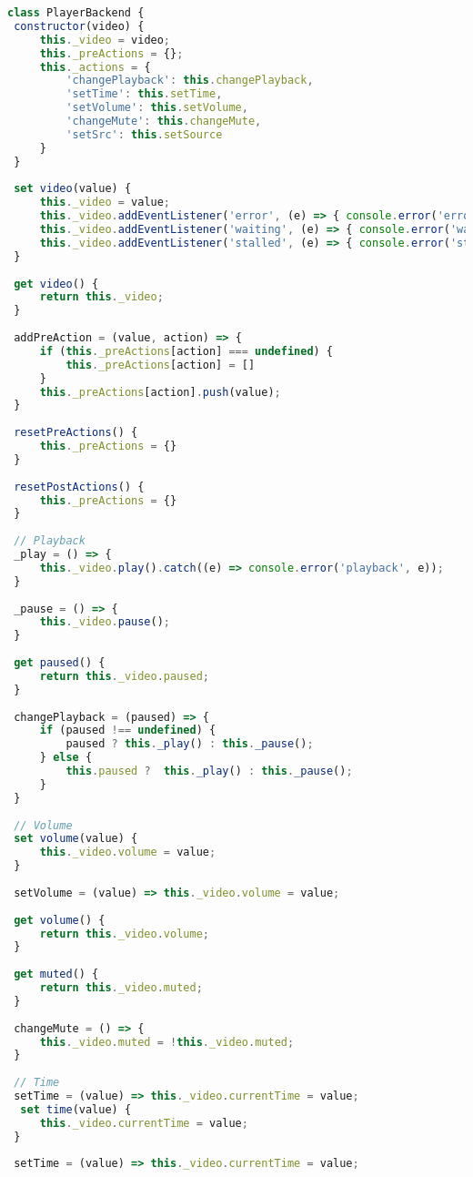 \begin{lstlisting}[language=JavaScript,label={lst:playerback},caption={Класс PlayerBackend}]
class PlayerBackend {
 constructor(video) {
     this._video = video;
     this._preActions = {};
     this._actions = {
         'changePlayback': this.changePlayback,
         'setTime': this.setTime,
         'setVolume': this.setVolume,
         'changeMute': this.changeMute,
         'setSrc': this.setSource
     }
 }
 
 set video(value) {
     this._video = value;
     this._video.addEventListener('error', (e) => { console.error('error', e) });
     this._video.addEventListener('waiting', (e) => { console.error('waiting', e) });
     this._video.addEventListener('stalled', (e) => { console.error('stalled', e) });
 }
 
 get video() {
     return this._video;
 }
 
 addPreAction = (value, action) => {
     if (this._preActions[action] === undefined) {
         this._preActions[action] = []
     }
     this._preActions[action].push(value);
 }
 
 resetPreActions() {
     this._preActions = {}
 }
 
 resetPostActions() {
     this._preActions = {}
 }
 
 // Playback
 _play = () => {
     this._video.play().catch((e) => console.error('playback', e));
 }
 
 _pause = () => {
     this._video.pause();
 }
 
 get paused() {
     return this._video.paused;
 }
 
 changePlayback = (paused) => {
     if (paused !== undefined) {
         paused ? this._play() : this._pause();
     } else {
         this.paused ?  this._play() : this._pause();
     }
 }
 
 // Volume
 set volume(value) {
     this._video.volume = value;
 }
 
 setVolume = (value) => this._video.volume = value;
 
 get volume() {
     return this._video.volume;
 }
 
 get muted() {
     return this._video.muted;
 }
 
 changeMute = () => {
     this._video.muted = !this._video.muted;
 }
 
 // Time
 setTime = (value) => this._video.currentTime = value;
  set time(value) {
     this._video.currentTime = value;
 }
 
 setTime = (value) => this._video.currentTime = value;
 

\end{lstlisting}
